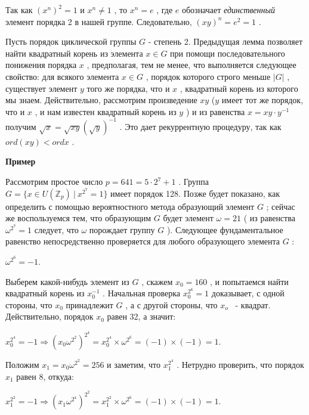\begin{myproof}
Так как $(x^n)^2=1$
 и $x^n\not= 1$
 , то $x^n=e$
, где $e$
 обозначает {\it единственный} элемент порядка 2 в нашей группе. Следовательно, $(xy)^n=e^2=1$
 .
\end{myproof}

\newpage

Пусть порядок циклической группы $G$ - степень 2. Предыдущая лемма позволяет найти квадратный корень из элемента $x\in G$
 при помощи последовательного понижения порядка $x$
 , предполагая, тем не менее, что выполняется следующее свойство: для всякого элемента $x\in G$
, порядок которого строго меньше $|G|$
, существует элемент $y$
того же порядка, что и $x$
, квадратный корень из которого мы знаем. Действительно, рассмотрим произведение $xy$
 ($y$
 имеет тот же порядок, что и $x$
 , и нам известен квадратный корень из $y$
) и из равенства $x=xy\cdot y^{-1}$
 получим $\sqrt x = \sqrt{xy}(\sqrt y)^{-1}$
 . Это дает рекуррентную процедуру, так как $ord(xy)<ord x$
.


{\bf Пример}

Рассмотрим простое число $p=641=5\cdot 2^7+1$
. Группа $G = \{x\in U(\mathbb{Z}_p)\ | \ x^{2^7}=1\}$
 имеет порядок 128. Позже будет показано, как определить с помощью вероятностного метода образующий элемент $G$
 ; сейчас же воспользуемся тем, что образующим $G$
 будет элемент $\omega=21$
 ( из равенства $\omega^{2^7}=1$
 следует, что $\omega$
 порождает группу $G$
 ). Следующее фундаментальное равенство непосредственно проверяется для любого образующего элемента $G$
 :

\begin{center}
$\omega^{2^6}=-1$.
\end{center}


Выберем какой-нибудь элемент из $G$
, скажем $x_0 = 160$
, и попытаемся найти квадратный корень из $x_0^{-1}$
. Начальная проверка $x_0^{2^6} = 1$
 доказывает, с одной стороны, что $x_0$
 принадлежит $G$
 , а с другой стороны, что $x_o$
 ~- квадрат. Действительно, порядок $x_0$
 равен 32, а значит:

\begin{center}
$x_0^{2^4}=-1\Rightarrow (x_0\omega^{2^2})^{2^4} = x_0^{2^4}\times\omega^{2^6}=(-1)\times(-1)=1$.
\end{center}


Положим $x_1=x_0\omega^{2^2}=256$
 и заметим, что $x_1^{2^4}$
 . Нетрудно проверить, что порядок $x_1$
 равен 8, откуда:

\begin{center}
$x_1^{2^2}=-1\Rightarrow (x_1\omega^{2^4})^{2^2} = x_1^{2^2}\times\omega^{2^6}=(-1)\times(-1)=1$.
\end{center}



